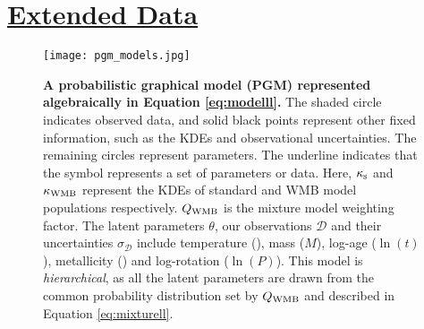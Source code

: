 \clearpage 
\section*{\underline{Extended Data}}

\setcounter{figure}{0}    

\begin{figure}[h!]
	\centering
	\texttt{[image: pgm\_models.jpg]}
	\caption{\textbf{A probabilistic graphical model (PGM) represented algebraically in Equation \ref{eq:modelll}.} The shaded circle indicates observed data, and solid black points represent other fixed information, such as the KDEs and observational uncertainties. The remaining circles represent parameters. The underline indicates that the symbol represents a set of parameters or data. Here, $\kappa_{\rm{s}}$ and $\kappa_{\rm WMB}$ represent the KDEs of standard and WMB model populations respectively. $Q_{\rm{WMB}}$ is the mixture model weighting factor. The latent parameters $\theta$, our observations $\mathcal{D}$ and their uncertainties $\sigma_{\mathcal{D}}$ include temperature (\teff), mass ($M$), log-age ($\ln(t)$), metallicity (\feh) and log-rotation ($\ln(P)$). This model is \textit{hierarchical}, as all the latent parameters are drawn from the common probability distribution set by $Q_{\rm{WMB}}$ and described in Equation \ref{eq:mixturell}.}
	\label{fig:pgm}
\end{figure}
 
